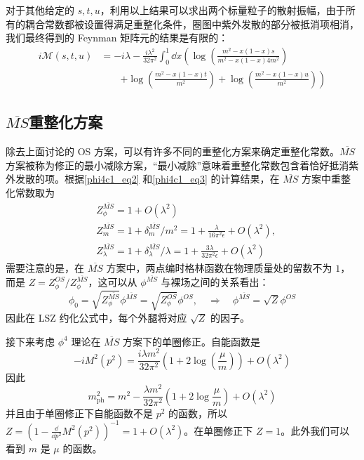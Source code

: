 对于其他给定的 $s,t,u$，利用以上结果可以求出两个标量粒子的散射振幅，由于所有的耦合常数都被设置得满足重整化条件，圈图中紫外发散的部分被抵消项相消，我们最终得到的 Feynman 矩阵元的结果是有限的：
\begin{equation}
\begin{aligned}
i\mathcal{M}(s,t,u)&=-i\lambda - \frac{i\lambda^2}{32\pi^2}\int_0^1 \dd x\left(\log\left(\frac{m^2-x(1-x)s}{m^2-x(1-x)4m^2}\right)\right.
\\
&\quad\quad\left.+
\log\left(\frac{m^2-x(1-x)t}{m^2}\right)
+
\log\left(\frac{m^2-x(1-x)u}{m^2}\right)
\right)
\end{aligned}
\end{equation}

\subsection{$\overline{MS}$重整化方案}

除去上面讨论的 OS 方案，可以有许多不同的重整化方案来确定重整化常数。$\overline{MS}$ 方案被称为修正的最小减除方案，“最小减除”意味着重整化常数包含着恰好抵消紫外发散的项。根据\autoref{phi4c1_eq2} 和\autoref{phi4c1_eq3} 的计算结果，在 $\overline{MS}$ 方案中重整化常数取为
\begin{equation}
\begin{aligned}
&Z^{\overline{MS}}_{\phi}=1+O(\lambda^2)\\
&Z^{\overline{MS}}_{m}=1+\delta^{\overline{MS}}_m/m^2 = 1+\frac{\lambda}{16\pi^2\epsilon}+O(\lambda^2),\\
&Z^{\overline{MS}}_{\lambda} = 1+\delta_\lambda^{\overline{MS}}/\lambda = 1+\frac{3\lambda}{32\pi^2\epsilon}+O(\lambda^2)
\end{aligned}
\end{equation}
需要注意的是，在 $\overline{MS}$ 方案中，两点编时格林函数在物理质量处的留数不为 $1$，而是 $Z=Z^{OS}_\phi/Z^{\overline{MS}}_\phi$，这可以从 $\phi^{\overline{MS}}$ 与裸场之间的关系看出：
\begin{equation}
\phi_0 = \sqrt{Z_\phi^{\overline{MS}}} \phi^{\overline{MS}} = \sqrt{Z_\phi^{OS}} \phi^{OS},\quad \Rightarrow \quad \phi^{\overline{MS}} = \sqrt{Z} \phi^{OS}
\end{equation}
因此在 LSZ 约化公式中，每个外腿将对应 $\sqrt{Z}$ 的因子。

接下来考虑 $\phi^4$ 理论在 $\overline{MS}$ 方案下的单圈修正。自能函数是
\begin{equation}
-iM^2(p^2)=\frac{i\lambda m^2}{32\pi^2}\left(1+2\log\left(\frac{\mu}{m}\right)\right)+O(\lambda^2)
\end{equation}
因此
\begin{equation}
m^2_\text{ph}=m^2-\frac{\lambda m^2}{32\pi^2}\left(1+2\log\frac{\mu}{m}\right)+O(\lambda^2)
\end{equation}
并且由于单圈修正下自能函数不是 $p^2$ 的函数，所以 $Z=(1-\frac{\dd}{\dd p^2}M^2(p^2))^{-1}= 1+O(\lambda^2)$。在单圈修正下 $Z=1$。此外我们可以看到 $m$ 是 $\mu$ 的函数。

